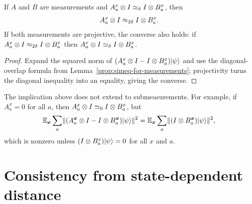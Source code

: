 \begin{lemma}\label{prop:simeq-to-approx}
	\leanok
	If $A$ and $B$ are measurements and $A_a^x \otimes I \simeq_\delta I \otimes B_a^x$, then
	\[
		A_a^x \otimes I \approx_{2\delta} I \otimes B_a^x.
	\]
	If both measurements are projective, the converse also holds: if $A_a^x \otimes I \approx_{2\delta} I \otimes B_a^x$ then $A_a^x \otimes I \simeq_\delta I \otimes B_a^x$.
\end{lemma}
\begin{proof}
	\leanok
	Expand the squared norm of $(A_a^x \otimes I - I \otimes B_a^x)\lvert \psi \rangle$ and use the diagonal-overlap formula from Lemma~\ref{prop:simeq-for-measurements}; projectivity turns the diagonal inequality into an equality, giving the converse.
\end{proof}

\begin{remark}\label{rem:simeq-not-approx-submeas}
	The implication above does not extend to submeasurements. For example, if
	$A_a^x=0$ for all $a$, then $A_a^x \otimes I \simeq_0 I \otimes B_a^x$, but
	\[
		\mathbb{E}_{{\boldsymbol{x}}} \sum_a \lVert (A^{{\boldsymbol{x}}}_a \otimes I - I \otimes B^{{\boldsymbol{x}}}_a)\lvert \psi \rangle \rVert^2
		= \mathbb{E}_{{\boldsymbol{x}}} \sum_a \lVert (I \otimes B^{{\boldsymbol{x}}}_a)\lvert \psi \rangle \rVert^2,
	\]
	which is nonzero unless $(I \otimes B_a^x)\lvert \psi \rangle=0$ for all $x$ and $a$.
\end{remark}

\section{Consistency from state-dependent distance}
\label{sec:consistency-from-state-dependent-distance}

